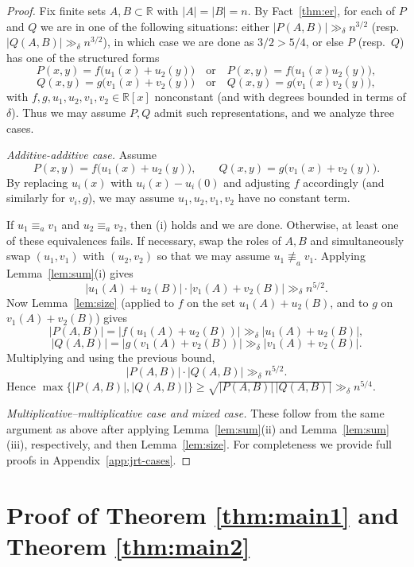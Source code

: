\documentclass[12pt,reqno]{amsart}
\numberwithin{equation}{section}
\begin{document}
\begin{proof}
Fix finite sets $A,B\subset\mathbb R$ with $|A|=|B|=n$.
By Fact~\ref{thm:er}, for each of $P$ and $Q$ we are in one of the following situations:
either $|P(A,B)|\gg_{\delta} n^{3/2}$ (resp.\ $|Q(A,B)|\gg_{\delta} n^{3/2}$), in which case we are done as $3/2>5/4$,
or else $P$ (resp.\ $Q$) has one of the structured forms
\[
P(x,y)=f\big(u_1(x)+u_2(y)\big)\quad\text{or}\quad P(x,y)=f\big(u_1(x)u_2(y)\big),
\]
\[
Q(x,y)=g\big(v_1(x)+v_2(y)\big)\quad\text{or}\quad Q(x,y)=g\big(v_1(x)v_2(y)\big),
\]
with $f,g,u_1,u_2,v_1,v_2\in\mathbb R[x]$ nonconstant (and with degrees bounded in terms of $\delta$).
Thus we may assume $P,Q$ admit such representations, and we analyze three cases.

\medskip
\noindent\emph{Additive-additive case.}
Assume
\[
P(x,y)=f\big(u_1(x)+u_2(y)\big),\qquad Q(x,y)=g\big(v_1(x)+v_2(y)\big).
\]
By replacing $u_i(x)$ with $u_i(x)-u_i(0)$ and adjusting $f$ accordingly (and similarly for $v_i,g$),
we may assume $u_1,u_2,v_1,v_2$ have no constant term.

If $u_1\equiv_a v_1$ and $u_2\equiv_a v_2$, then (i) holds and we are done.
Otherwise, at least one of these equivalences fails. If necessary, swap the roles of $A,B$ and simultaneously
swap $(u_1,v_1)$ with $(u_2,v_2)$ so that we may assume
$u_1\not\equiv_a v_1$.
Applying Lemma~\ref{lem:sum}(i) gives
\[
|u_1(A)+u_2(B)|\cdot |v_1(A)+v_2(B)|\gg_{\delta} n^{5/2}.
\]
Now Lemma~\ref{lem:size} (applied to $f$ on the set $u_1(A)+u_2(B)$, and to $g$ on $v_1(A)+v_2(B)$) gives
\[
|P(A,B)|=|f(u_1(A)+u_2(B))|\gg_{\delta} |u_1(A)+u_2(B)|,
\]
\[
|Q(A,B)|=|g(v_1(A)+v_2(B))|\gg_{\delta} |v_1(A)+v_2(B)|.
\]
Multiplying and using the previous bound,
\[
|P(A,B)|\cdot |Q(A,B)|\gg_{\delta} n^{5/2}.
\]
Hence $\max\{|P(A,B)|,|Q(A,B)|\}\ge \sqrt{|P(A,B)|\,|Q(A,B)|}\gg_{\delta} n^{5/4}$.

\medskip
\noindent\emph{Multiplicative--multiplicative case and mixed case.}
These follow from the same argument as above after applying Lemma~\ref{lem:sum}(ii) and Lemma~\ref{lem:sum}(iii),
respectively, and then Lemma~\ref{lem:size}.
For completeness we provide full proofs in Appendix~\ref{app:jrt-cases}.
\end{proof}

\section{Proof of Theorem \ref{thm:main1} and  Theorem \ref{thm:main2}}
\end{document}
